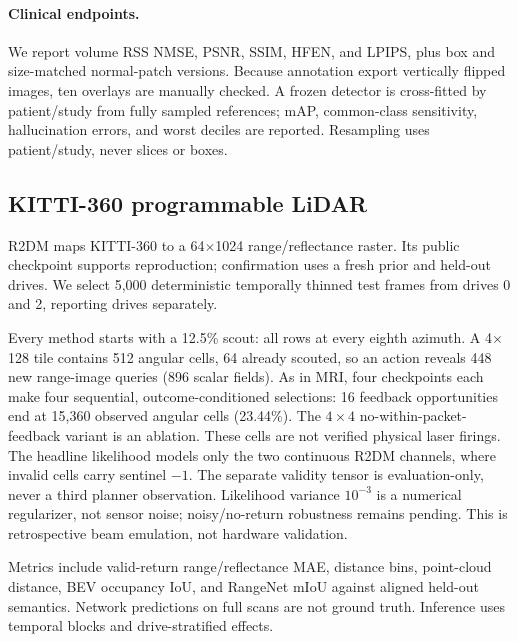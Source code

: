 \paragraph{Clinical endpoints.}
We report volume RSS NMSE, PSNR, SSIM, HFEN, and LPIPS, plus box and
size-matched normal-patch versions.  Because annotation export vertically
flipped images, ten overlays are manually checked.  A frozen detector is
cross-fitted by patient/study from fully sampled references; mAP, common-class
sensitivity, hallucination errors, and worst deciles are reported.  Resampling
uses patient/study, never slices or boxes.

\subsection{KITTI-360 programmable LiDAR}

R2DM \cite{nakashima2024r2dm} maps KITTI-360
\cite{liao2023kitti360} to a 64$\times$1024 range/reflectance raster.  Its
public checkpoint supports reproduction; confirmation uses a fresh prior and
held-out drives.  We select 5,000 deterministic temporally thinned test frames
from drives 0 and 2, reporting drives separately.

Every method starts with a 12.5\% scout: all rows at every eighth azimuth.
A 4$\times$128 tile contains 512 angular cells, 64 already scouted, so an
action reveals 448 new range-image queries (896 scalar fields).  As in MRI,
four checkpoints each make four sequential, outcome-conditioned selections:
16 feedback opportunities end at 15,360 observed angular cells (23.44\%).
The $4\times4$ no-within-packet-feedback variant is an ablation.  These cells
are not verified physical laser firings.  The headline likelihood models only
the two continuous R2DM channels, where invalid cells carry sentinel $-1$.
The separate validity tensor is evaluation-only, never a third planner
observation.  Likelihood variance $10^{-3}$ is a numerical regularizer, not
sensor noise; noisy/no-return robustness remains pending.  This is
retrospective beam emulation, not hardware validation.

Metrics include valid-return range/reflectance MAE, distance bins,
point-cloud distance, BEV occupancy IoU, and RangeNet mIoU against aligned
held-out semantics.  Network predictions on full scans are not ground truth.
Inference uses temporal blocks and drive-stratified effects.

